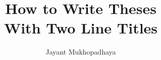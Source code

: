 \documentclass[12pt]{report}
\title{How to Write Theses\\
            With Two Line Titles}
\author{Jayant Mukhopadhaya}
\begin{document}
\maketitle
\onlinesignature
\end{document}
